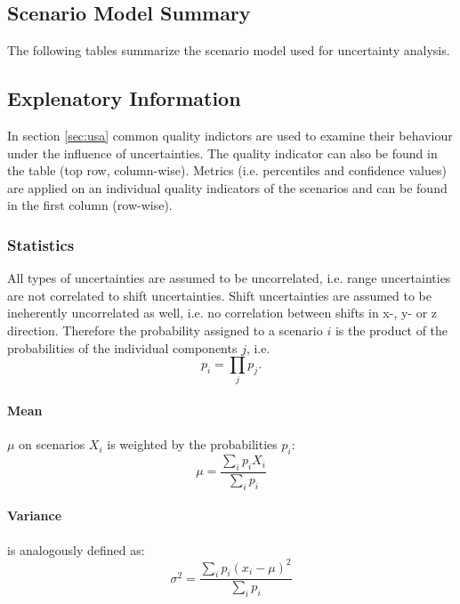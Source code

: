 \documentclass[a4paper]{scrartcl}
\begin{document}
\subsection{Scenario Model Summary}

The following tables summarize the scenario model used for uncertainty analysis.



\subsection{Explenatory Information}
In section \ref{sec:usa} common quality indictors are used to examine their behaviour under the influence of uncertainties. 
The quality indicator can also be found in the table (top row, column-wise).
Metrics (i.e. percentiles and confidence values) are applied on an individual quality indicators of the scenarios and can be found in the first column (row-wise).

\subsubsection{Statistics}
All types of uncertainties are assumed to be uncorrelated, i.e. range uncertainties are not correlated to shift uncertainties.
Shift uncertainties are assumed to be ineherently uncorrelated as well, i.e. no correlation between shifts in x-, y- or z direction.
Therefore the probability assigned to a scenario $i$ is the product of the probabilities of the individual components $j$, i.e.
\begin{equation}
  p_i = \prod\limits_j p_j.
\end{equation}
 
\paragraph{Mean} $\mu$ on scenarios $X_i$ is weighted by the probabilities $p_i$:
\begin{equation}
  \mu = \frac{\sum\limits_{i} p_i X_i}{\sum\limits_{i} p_i}
\end{equation}
 
\paragraph{Variance} is analogously defined as:
\begin{equation}
	\sigma^2 = \frac{\sum\limits_{i} p_{i}\left(x_{i}-\mu\right)^{2}}{\sum\limits _{i}p_{i}}
\end{equation}
\end{document}
